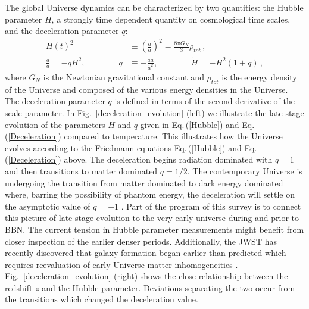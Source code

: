 \documentclass[universe,article,submit,moreauthors,pdftex,a4paper]{Definitions/mdpi}
\newcommand{\req}[1]{Eq.\,(\ref{#1})}
\newcommand*{\rf}[1]{Fig.~{\ref{#1}}}
\begin{document}
The global Universe dynamics can be characterized by two  quantities: the Hubble parameter  $H$, a strongly time dependent quantity on cosmological time scales,  and the deceleration parameter $q$:
\begin{align}
  \label{Hubble} H(t)^{2}&\equiv\left(\frac{\dot a}{a}\right)^2=\frac{8\pi G_{N}}{3}\rho_{tot}\,,\\
  \label{Deceleration} \frac{\ddot a}{a}=-qH^2,\qquad\qquad q&\equiv -\frac{a\ddot a}{\dot a^2},\qquad\qquad \dot H=-H^2(1+q)\,,    
\end{align}
where $G_{N}$ is the Newtonian gravitational constant and $\rho_{tot}$ is the energy density of the Universe and composed of the various energy densities in the Universe. The deceleration parameter $q$ is defined in terms of the second derivative of the scale parameter. In \rf{deceleration_evolution} (left) we illustrate the late stage evolution of the parameters $H$ and $q$ given in \req{Hubble} and \req{Deceleration} compared to temperature. This illustrates how the Universe evolves according to the Friedmann equations \req{Hubble} and \req{Deceleration} above. The deceleration begins radiation dominated with $q=1$ and then transitions to matter dominated $q=1/2$. The contemporary Universe is undergoing the transition from matter dominated to dark energy dominated where, barring the possibility of phantom energy, the deceleration will settle on the asymptotic value of $q=-1$ \cite{Rafelski:2013yka}. Part of the program of this survey is to connect this picture of late stage evolution to the very early universe during and prior to BBN. The current tension in Hubble parameter measurements \cite{Perivolaropoulos:2021jda,DiValentino:2021izs,Aluri:2022hzs}
might benefit from closer inspection of the earlier denser periods. Additionally, the JWST has recently discovered that galaxy formation began earlier than predicted which requires reevaluation of early Universe matter inhomogeneities \cite{Yan:2022sxd}. \rf{deceleration_evolution} (right) shows the close relationship between the redshift $z$ and the Hubble parameter. Deviations separating the two occur from the transitions which changed the deceleration value.
\end{document}
